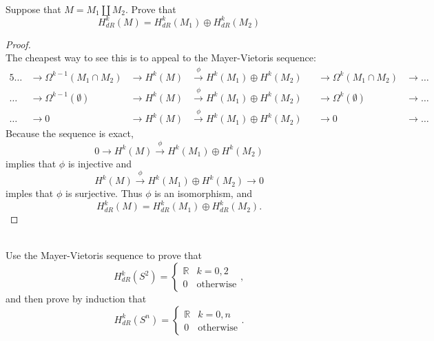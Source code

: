 \documentclass{article}
\newenvironment{problem}[2][Problem]{\begin{trivlist}
\item[\hskip \labelsep {\bfseries #1}\hskip \labelsep {\bfseries #2.}]}{\end{trivlist}}
\begin{document}
\begin{problem}{3} \text{} \\
  Suppose that $M = M_1 \coprod M_2$. Prove that \[
    H_{dR}^k(M) = H_{dR}^k(M_1) \oplus H_{dR}^k(M_2)
  \]
\end{problem}

\begin{proof} \text{} \\
  The cheapest way to see this is to appeal to the Mayer-Vietoris sequence:
  \begin{alignat*}{5}
    \hdots
      &\rightarrow \Omega^{k-1}(M_1 \cap M_2)
      &\rightarrow H^k(M)
      &\xrightarrow{\phi} H^k(M_1) \oplus H^k(M_2)
      &&\rightarrow \Omega^k(M_1 \cap M_2)
    &\rightarrow \hdots \\
    \hdots
      &\rightarrow \Omega^{k-1}(\emptyset)
      &\rightarrow H^k(M)
      &\xrightarrow{\phi} H^k(M_1) \oplus H^k(M_2)
      &&\rightarrow \Omega^k(\emptyset)
    &\rightarrow \hdots \\
    \hdots
      &\rightarrow 0
      &\rightarrow H^k(M)
      &\xrightarrow{\phi} H^k(M_1) \oplus H^k(M_2)
      &&\rightarrow 0
    &\rightarrow \hdots
  \end{alignat*}
  Because the sequence is exact, \[
  0 \rightarrow H^k(M)
    \xrightarrow{\phi} H^k(M_1) \oplus H^k(M_2)
  \] implies that $\phi$ is injective and \[
    H^k(M) \xrightarrow{\phi} H^k(M_1) \oplus H^k(M_2) \rightarrow 0
  \] imples that $\phi$ is surjective. Thus $\phi$ is an isomorphism, and \[
    H_{dR}^k(M) = H_{dR}^k(M_1) \oplus H_{dR}^k(M_2).
  \]
\end{proof}
\pagebreak

\begin{problem}{4} \text{} \\
  Use the Mayer-Vietoris sequence to prove that \[
    H_{dR}^k(S^2) = \begin{cases}
      \mathbb{R} & k = 0,2 \\
      0 & \text{otherwise}
    \end{cases},
  \] and then prove by induction that \[
    H_{dR}^k(S^n) = \begin{cases}
      \mathbb{R} & k = 0,n \\
      0 & \text{otherwise}
    \end{cases}.
  \]
\end{problem}
\end{document}
